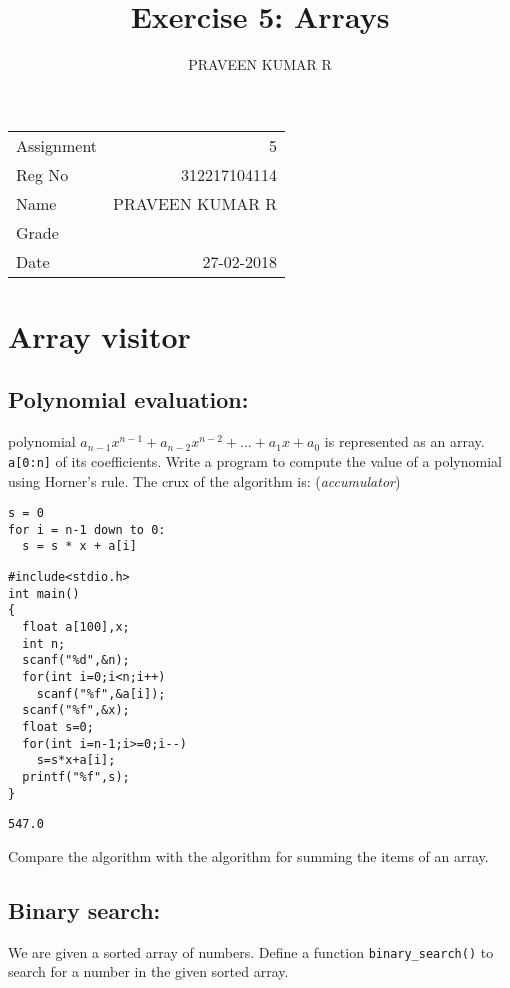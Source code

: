 \documentclass[11pt]{article}
\author{PRAVEEN KUMAR R}
\date{}
\title{Exercise 5: Arrays}
\begin{document}
\maketitle
\begin{center}
\begin{tabular}{lr}
Assignment & 5\\
Reg No & 312217104114\\
Name & PRAVEEN KUMAR R\\
Grade & \\
Date & 27-02-2018\\
\end{tabular}
\end{center}
\begin{export}
\linespread{1.2}
\end{export}
\section{Array visitor}
\label{sec-1}
\subsection*{\textbf{Polynomial evaluation}:}
\label{sec-1-1}
polynomial $a_{n-1}x^{n-1} + a_{n-2}x^{n-2} + \ldots + a_{1}x + a_{0}$
is represented as an array.
\texttt{a[0:n]} of its coefficients. Write a program to compute the value
of a polynomial using Horner's rule. The crux of the algorithm is:
\hfill (\emph{accumulator})
\linespread{1}
\begin{verbatim}
s = 0
for i = n-1 down to 0:
  s = s * x + a[i]
\end{verbatim}
\begin{verbatim}
#include<stdio.h>
int main()
{
  float a[100],x;
  int n;
  scanf("%d",&n);
  for(int i=0;i<n;i++)
    scanf("%f",&a[i]);
  scanf("%f",&x);
  float s=0;
  for(int i=n-1;i>=0;i--)
    s=s*x+a[i];
  printf("%f",s);
}
\end{verbatim}

\begin{verbatim}
547.0
\end{verbatim}

\linespread{1.2}
Compare the algorithm with the algorithm for summing the items of
an array.
\subsection*{\textbf{Binary search}:}
\label{sec-1-2}
We are given a sorted array of numbers. Define a
  function \texttt{binary\_search()} to search for a number in the given sorted 
  array.
\end{document}

